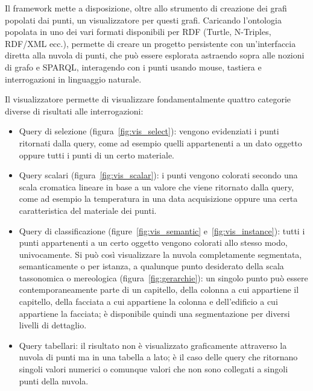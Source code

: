 Il framework mette a disposizione, oltre allo strumento di creazione dei grafi popolati dai punti, un visualizzatore per questi grafi.
Caricando l'ontologia popolata in uno dei vari formati disponibili per RDF (Turtle, N-Triples, RDF/XML ecc.), permette di creare
un progetto persistente con un'interfaccia diretta alla nuvola di punti, che può essere esplorata astraendo sopra alle nozioni di
grafo e SPARQL, interagendo con i punti usando mouse, tastiera e interrogazioni in linguaggio naturale. 
\par Il visualizzatore permette di visualizzare fondamentalmente quattro categorie diverse di risultati alle interrogazioni:
\begin{itemize}
\item Query di selezione (figura~\ref{fig:vis_select}): vengono evidenziati i punti ritornati dalla query, come ad esempio quelli appartenenti a un dato
oggetto oppure tutti i punti di un certo materiale.
\item Query scalari (figura~\ref{fig:vis_scalar}): i punti vengono colorati secondo una scala cromatica lineare in base a un valore che viene ritornato dalla
query, come ad esempio la temperatura in una data acquisizione oppure una certa caratteristica del materiale dei punti.
\item Query di classificazione (figure~\ref{fig:vis_semantic} e~\ref{fig:vis_instance}): tutti i punti appartenenti a un certo oggetto vengono colorati allo stesso modo, univocamente.
Si può così visualizzare la nuvola completamente segmentata, semanticamente o per istanza, a qualunque punto desiderato della scala
tassonomica o mereologica (figura~\ref{fig:gerarchie}): un singolo punto può essere contemporaneamente parte di un capitello, della colonna a cui appartiene il capitello,
della facciata a cui appartiene la colonna e dell'edificio a cui appartiene la facciata; è disponibile quindi una segmentazione per
diversi livelli di dettaglio.
\item Query tabellari: il risultato non è visualizzato graficamente attraverso la nuvola di punti ma in una tabella a lato; è il caso
delle query che ritornano singoli valori numerici o comunque valori che non sono collegati a singoli punti della nuvola.
\end{itemize}

